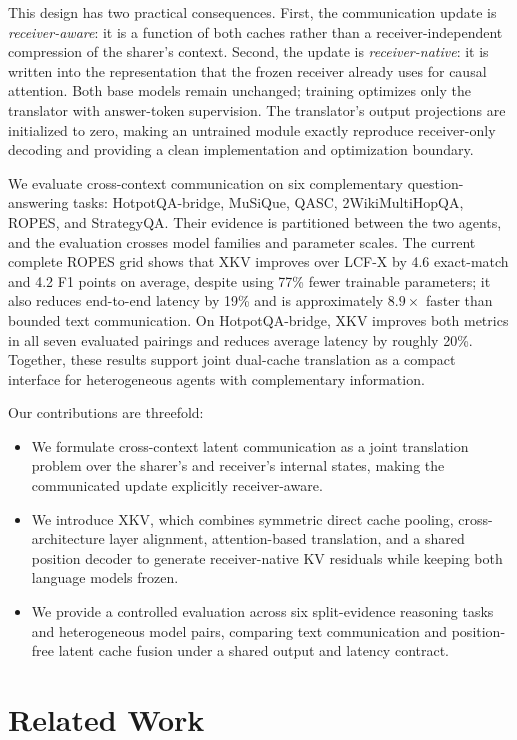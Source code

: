 \documentclass[11pt]{article}
\newcommand{\xkv}{\textsc{XKV}\xspace}
\newcommand{\lcfx}{\textsc{LCF-X}\xspace}
\begin{document}
This design has two practical consequences. First, the communication update is
\emph{receiver-aware}: it is a function of both caches rather than a
receiver-independent compression of the sharer's context. Second, the update is
\emph{receiver-native}: it is written into the representation that the frozen
receiver already uses for causal attention. Both base models remain unchanged;
training optimizes only the translator with answer-token supervision. The
translator's output projections are initialized to zero, making an untrained
module exactly reproduce receiver-only decoding and providing a clean
implementation and optimization boundary.

We evaluate cross-context communication on six complementary question-answering
tasks: HotpotQA-bridge, MuSiQue, QASC, 2WikiMultiHopQA, ROPES, and StrategyQA.
Their evidence is partitioned between the two agents, and the evaluation crosses
model families and parameter scales. The current complete ROPES grid shows that
\xkv improves over \lcfx by 4.6 exact-match and 4.2 F1 points on average, despite
using 77\% fewer trainable parameters; it also reduces end-to-end latency by
19\% and is approximately $8.9\times$ faster than bounded text communication.
On HotpotQA-bridge, \xkv improves both metrics in all seven evaluated pairings
and reduces average latency by roughly 20\%. Together, these results support
joint dual-cache translation as a compact interface for heterogeneous agents
with complementary information.

Our contributions are threefold:
\begin{itemize}
  \item We formulate cross-context latent communication as a joint translation
  problem over the sharer's and receiver's internal states, making the
  communicated update explicitly receiver-aware.
  \item We introduce \xkv, which combines symmetric direct cache pooling,
  cross-architecture layer alignment, attention-based translation, and a shared
  position decoder to generate receiver-native KV residuals while keeping both
  language models frozen.
  \item We provide a controlled evaluation across six split-evidence reasoning
  tasks and heterogeneous model pairs, comparing text communication and
  position-free latent cache fusion under a shared output and latency contract.
\end{itemize}

\section{Related Work}
\end{document}
